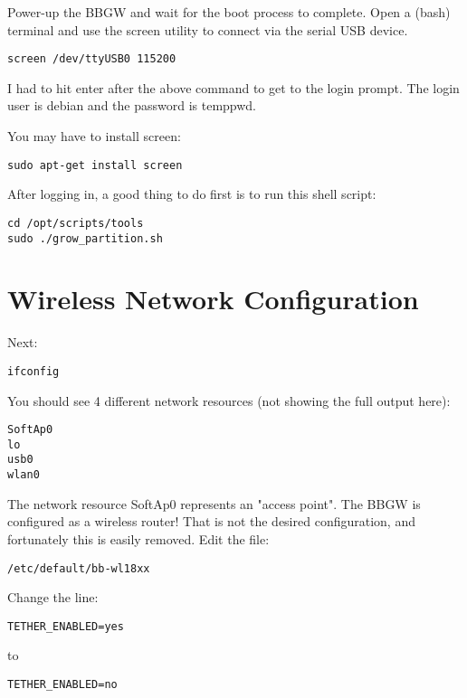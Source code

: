 Power-up the BBGW and wait for the boot process to complete.
Open a (bash) terminal and use the screen utility to connect via the serial USB 
device.

\begin{verbatim}
screen /dev/ttyUSB0 115200
\end{verbatim}

I had to hit enter after the above command to get to the login prompt.
The login user is debian and the password is temppwd.

You may have to install screen:

\begin{verbatim}
sudo apt-get install screen
\end{verbatim}

After logging in, a good thing to do first is to run this shell script:

\begin{verbatim}
cd /opt/scripts/tools
sudo ./grow_partition.sh
\end{verbatim}

\section{Wireless Network Configuration}

Next:

\begin{verbatim}
ifconfig
\end{verbatim}

You should see 4 different network resources (not showing the full output here):

\begin{verbatim}
SoftAp0
lo
usb0
wlan0
\end{verbatim}

The network resource SoftAp0 represents an "access point".
The BBGW is configured as a wireless router!
That is not the desired configuration, and fortunately this is easily removed.
Edit the file:

\begin{verbatim}
/etc/default/bb-wl18xx
\end{verbatim}

Change the line:

\begin{verbatim}
TETHER_ENABLED=yes
\end{verbatim}

to

\begin{verbatim}
TETHER_ENABLED=no
\end{verbatim}


